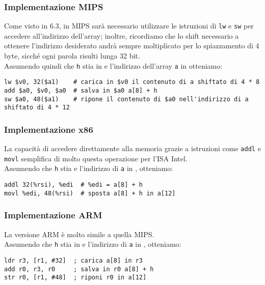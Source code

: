 \documentclass[class=book, crop=false, oneside]{standalone}
\begin{document}
\subsubsection{Implementazione MIPS}
Come visto in 6.3, in MIPS sarà necessario utilizzare le istruzioni di \texttt{lw} e \texttt{sw} per accedere all'indirizzo dell'array; inoltre, ricordiamo che  lo shift necessario a ottenere l'indirizzo desiderato andrà sempre moltiplicato per lo spiazzamento di 4 byte, sicché ogni parola risulti lunga 32 bit.\\
Assumendo quindi che \texttt{h} stia in  e l'indirizzo dell'array \texttt{a} in  otteniamo:
\begin{verbatim}
lw $v0, 32($a1)    # carica in $v0 il contenuto di a shiftato di 4 * 8
add $a0, $v0, $a0  # salva in $a0 a[8] + h
sw $a0, 48($a1)    # ripone il contenuto di $a0 nell'indirizzo di a shiftato di 4 * 12
\end{verbatim}

\subsubsection{Implementazione x86}
La capacità di accedere direttamente alla memoria grazie a istruzioni come \texttt{addl} e \texttt{movl} semplifica di molto questa operazione per l'ISA Intel.\\
Assumendo che  \texttt{h} stia  e l'indirizzo di \texttt{a} in , otteniamo:
\begin{verbatim}
addl 32(%rsi), %edi  # %edi = a[8] + h
movl %edi, 48(%rsi)  # sposta a[8] + h in a[12]
\end{verbatim}

\subsubsection{Implementazione ARM}
La versione ARM è molto simile a quella MIPS.\\
Assumendo che \texttt{h} stia in  e l'indirizzo di \texttt{a} in , otteniamo:
\begin{verbatim}
ldr r3, [r1, #32]  ; carica a[8] in r3
add r0, r3, r0     ; salva in r0 a[8] + h
str r0, [r1, #48]  ; riponi r0 in a[12]
\end{verbatim}
\end{document}

